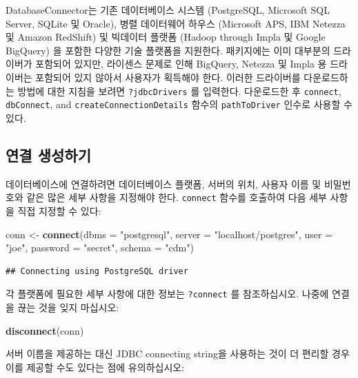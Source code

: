 \documentclass[11pt]{book}
\newenvironment{Shaded}{\begin{snugshade}}{\end{snugshade}}
\newcommand{\KeywordTok}[1]{\textcolor[rgb]{0.13,0.29,0.53}{\textbf{#1}}}
\newcommand{\DataTypeTok}[1]{\textcolor[rgb]{0.13,0.29,0.53}{#1}}
\newcommand{\StringTok}[1]{\textcolor[rgb]{0.31,0.60,0.02}{#1}}
\newcommand{\NormalTok}[1]{#1}
\theoremstyle{definition}
\theoremstyle{definition}
\theoremstyle{definition}
\theoremstyle{remark}
\begin{document}
DatabaseConnector는 기존 데이터베이스 시스템 (PostgreSQL, Microsoft SQL
Server, SQLite 및 Oracle), 병렬 데이터웨어 하우스 (Microsoft APS, IBM
Netezza 및 Amazon RedShift) 및 빅데이터 플랫폼 (Hadoop through Impla 및
Google BigQuery) 을 포함한 다양한 기술 플랫폼을 지원한다. 패키지에는
이미 대부분의 드라이버가 포함되어 있지만, 라이센스 문제로 인해 BigQuery,
Netezza 및 Impla 용 드라이버는 포함되어 있지 않아서 사용자가 획득해야
한다. 이러한 드라이버를 다운로드하는 방법에 대한 지침을 보려면
\texttt{?jdbcDrivers} 를 입력한다. 다운로드한 후 \texttt{connect},
\texttt{dbConnect}, and \texttt{createConnectionDetails} 함수의
\texttt{pathToDriver} 인수로 사용할 수 있다.

\subsection{연결 생성하기}\label{-}

데이터베이스에 연결하려면 데이터베이스 플랫폼, 서버의 위치, 사용자 이름
및 비밀번호와 같은 많은 세부 사항을 지정해야 한다. \texttt{connect}
함수를 호출하여 다음 세부 사항을 직접 지정할 수 있다:

\begin{Shaded}
\begin{Highlighting}[]
\NormalTok{conn <-}\StringTok{ }\KeywordTok{connect}\NormalTok{(}\DataTypeTok{dbms =} \StringTok{"postgresql"}\NormalTok{,}
                \DataTypeTok{server =} \StringTok{"localhost/postgres"}\NormalTok{,}
                \DataTypeTok{user =} \StringTok{"joe"}\NormalTok{,}
                \DataTypeTok{password =} \StringTok{"secret"}\NormalTok{,}
                \DataTypeTok{schema =} \StringTok{"cdm"}\NormalTok{)}
\end{Highlighting}
\end{Shaded}

\begin{verbatim}
## Connecting using PostgreSQL driver
\end{verbatim}

각 플랫폼에 필요한 세부 사항에 대한 정보는 \texttt{?connect} 를
참조하십시오. 나중에 연결을 끊는 것을 잊지 마십시오:

\begin{Shaded}
\begin{Highlighting}[]
\KeywordTok{disconnect}\NormalTok{(conn)}
\end{Highlighting}
\end{Shaded}

서버 이름을 제공하는 대신 JDBC connecting string을 사용하는 것이 더
편리할 경우 이를 제공할 수도 있다는 점에 유의하십시오:
\end{document}
